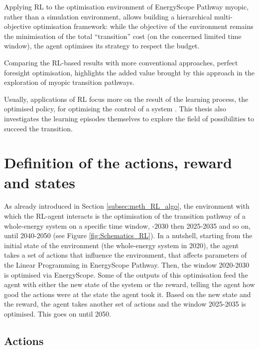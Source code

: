 Applying \gls{RL} to the optimisation environment of EnergyScope Pathway myopic,  rather than a simulation environment, allows building a hierarchical multi-objective optimisation framework: while the objective of the environment remains the minimisation of the total ``transition'' cost (on the concerned limited time window), the agent optimises its strategy to respect the  budget. 

Comparing the \gls{RL}-based results with more conventional approaches, \ie perfect foresight optimisation, highlights the added value brought by this approach in the exploration of myopic transition pathways.

Usually, applications of \gls{RL} focus more on the result of the learning process, the optimised policy, for optimising the control of a system \cite{perera2021applications}. This thesis also investigates the learning episodes themselves to explore the field of possibilities to succeed the transition.


\section{Definition of the actions, reward and states}
\label{sec:RL:act_states_rew}
As already introduced in Section \ref{subsec:meth_RL_algo}, the environment with which the \gls{RL}-agent interacts is the optimisation of the transition pathway of a whole-energy system on a specific time window, -2030 then 2025-2035 and so on, until 2040-2050 (see Figure \ref{fig:Schematics_RL}). In a nutshell, starting from the initial state of the environment (\ie the whole-energy system in 2020), the agent takes a set of actions that influence the environment, \ie that affects parameters of the Linear Programming in EnergyScope Pathway. Then, the window 2020-2030 is optimised via EnergyScope. Some of the outputs of this optimisation feed the agent with either the new state of the system or the reward, \ie telling the agent how good the actions were at the state the agent took it. Based on the new state and the reward, the agent takes another set of actions and the window 2025-2035 is optimised. This goes on until 2050.



\subsection{Actions}
\label{subsec:RL:act_states_rew:act}

